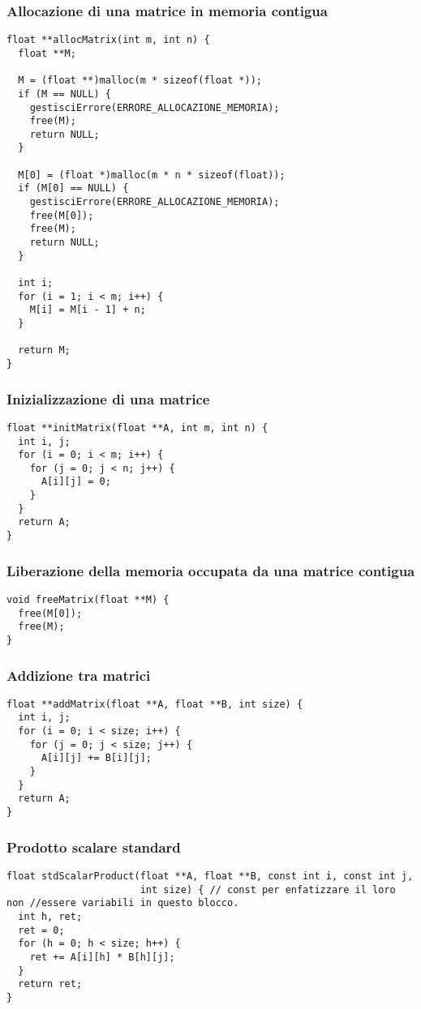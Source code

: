 \subsubsection{Allocazione di una matrice in memoria contigua}
\begin{lstlisting}
float **allocMatrix(int m, int n) {
  float **M;

  M = (float **)malloc(m * sizeof(float *));
  if (M == NULL) {
    gestisciErrore(ERRORE_ALLOCAZIONE_MEMORIA);
    free(M);
    return NULL;
  }

  M[0] = (float *)malloc(m * n * sizeof(float));
  if (M[0] == NULL) {
    gestisciErrore(ERRORE_ALLOCAZIONE_MEMORIA);
    free(M[0]);
    free(M);
    return NULL;
  }

  int i;
  for (i = 1; i < m; i++) {
    M[i] = M[i - 1] + n;
  }

  return M;
}
\end{lstlisting}
\subsubsection{Inizializzazione di una matrice}
\begin{lstlisting}
float **initMatrix(float **A, int m, int n) {
  int i, j;
  for (i = 0; i < m; i++) {
    for (j = 0; j < n; j++) {
      A[i][j] = 0;
    }
  }
  return A;
}
\end{lstlisting}

\subsubsection{Liberazione della memoria occupata da una matrice contigua}
\begin{lstlisting}
void freeMatrix(float **M) {
  free(M[0]);
  free(M);
}
\end{lstlisting}
\subsubsection{Addizione tra matrici}
\begin{lstlisting}
float **addMatrix(float **A, float **B, int size) {
  int i, j;
  for (i = 0; i < size; i++) {
    for (j = 0; j < size; j++) {
      A[i][j] += B[i][j];
    }
  }
  return A;
}
\end{lstlisting}

\subsubsection{Prodotto scalare standard}
\begin{lstlisting}
float stdScalarProduct(float **A, float **B, const int i, const int j,
                       int size) { // const per enfatizzare il loro non //essere variabili in questo blocco.
  int h, ret;
  ret = 0;
  for (h = 0; h < size; h++) {
    ret += A[i][h] * B[h][j];
  }
  return ret;
}
\end{lstlisting}

